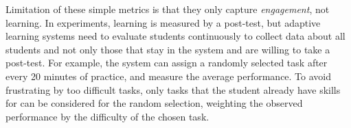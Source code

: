 Limitation of these simple metrics is that they only capture \emph{engagement},
not learning.
In experiments, learning is measured by a %
post-test,
but adaptive learning systems need to evaluate students continuously to collect data about
all students and not only those that stay in the system and are willing
to take a post-test.
For example, the system can assign a randomly selected task after every 20 minutes of practice,
and measure the average performance.
To avoid frustrating by too difficult tasks, only tasks that the student already have
skills for can be considered for the random selection,
weighting the observed performance by the difficulty of the chosen task.


%


